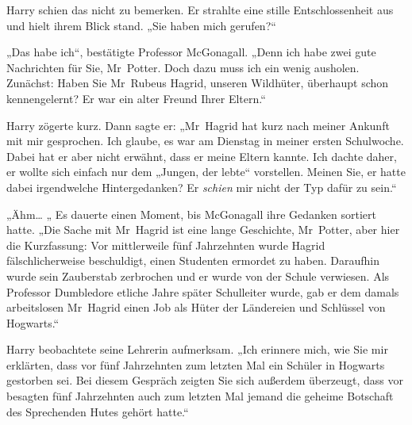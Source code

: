 Harry schien das nicht zu bemerken. Er strahlte eine stille Entschlossenheit aus und hielt ihrem Blick stand. „Sie haben mich gerufen?“

„Das habe ich“, bestätigte Professor McGonagall. „Denn ich habe zwei gute Nachrichten für Sie, Mr~Potter. Doch dazu muss ich ein wenig ausholen. Zunächst: Haben Sie Mr~Rubeus Hagrid, unseren Wildhüter, überhaupt schon kennengelernt? Er war ein alter Freund Ihrer Eltern.“

Harry zögerte kurz. Dann sagte er: „Mr~Hagrid hat kurz nach meiner Ankunft mit mir gesprochen. Ich glaube, es war am Dienstag in meiner ersten Schulwoche. Dabei hat er aber nicht erwähnt, dass er meine Eltern kannte. Ich dachte daher, er wollte sich einfach nur dem „Jungen, der lebte“ vorstellen. Meinen Sie, er hatte dabei irgendwelche Hintergedanken? Er \emph{schien} mir nicht der Typ dafür zu sein.“

„Ähm… „ Es dauerte einen Moment, bis McGonagall ihre Gedanken sortiert hatte. „Die Sache mit Mr~Hagrid ist eine lange Geschichte, Mr~Potter, aber hier die Kurzfassung: Vor mittlerweile fünf Jahrzehnten wurde Hagrid fälschlicherweise beschuldigt, einen Studenten ermordet zu haben. Daraufhin wurde sein Zauberstab zerbrochen und er wurde von der Schule verwiesen. Als Professor Dumbledore etliche Jahre später Schulleiter wurde, gab er dem damals arbeitslosen Mr~Hagrid einen Job als Hüter der Ländereien und Schlüssel von Hogwarts.“

Harry beobachtete seine Lehrerin aufmerksam. „Ich erinnere mich, wie Sie mir erklärten, dass vor fünf Jahrzehnten zum letzten Mal ein Schüler in Hogwarts gestorben sei. Bei diesem Gespräch zeigten Sie sich außerdem überzeugt, dass vor besagten fünf Jahrzehnten auch zum letzten Mal jemand die geheime Botschaft des Sprechenden Hutes gehört hatte.“

